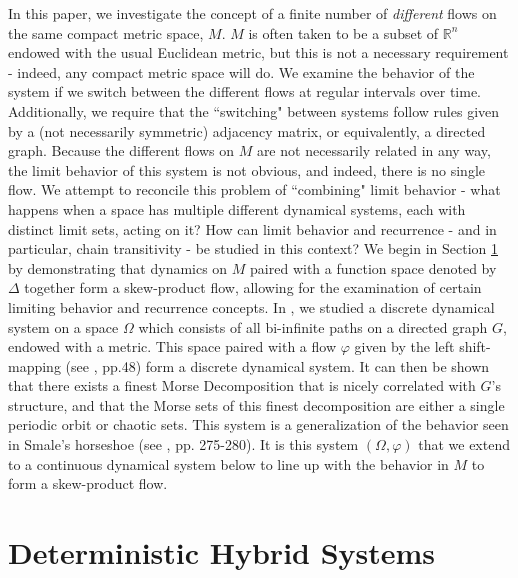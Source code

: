 \documentclass[11pt]{article}
\begin{document}
\indent In this paper, we investigate the concept of a finite number of \emph{different} flows on the same compact metric space, $M$.  $M$ is often taken to be a subset of $\mathbb{R}^n$ endowed with the usual Euclidean metric, but this is not a necessary requirement - indeed, any compact metric space will do.  We examine the behavior of the system if we switch between the different flows at regular intervals over time.  Additionally, we require that the ``switching" between systems follow rules given by a (not necessarily symmetric) adjacency matrix, or equivalently, a directed graph.  Because the different flows on $M$ are not necessarily related in any way, the limit behavior of this system is not obvious, and indeed, there is no single flow.  We attempt to reconcile this problem of ``combining" limit behavior - what happens when a space has multiple different dynamical systems, each with distinct limit sets, acting on it?  How can limit behavior and recurrence - and in particular, chain transitivity - be studied in this context? We begin in Section \ref{DHS} by demonstrating that dynamics on $M$ paired with a function space denoted by $\Delta$ together form a skew-product flow, allowing for the examination of certain limiting behavior and recurrence concepts.  In \cite{discretesystems}, we studied a discrete dynamical system on a space $\Omega$ which consists of all bi-infinite paths on a directed graph $G$, endowed with a metric.   This space paired with a flow $\varphi$ given by the left shift-mapping (see \cite{Katok}, pp.48) form a discrete dynamical system.  It can then be shown that there exists a finest Morse Decomposition that is nicely correlated with $G$'s structure, and that the Morse sets of this finest decomposition are either a single periodic orbit or chaotic sets.  This system is a generalization of the behavior seen in Smale's horseshoe (see 
\cite{Robinson}, pp. 275-280).  It is this system $(\Omega, \varphi)$ that we extend to a continuous dynamical system below to line up with the behavior in $M$ to form a skew-product flow.\\


\section{Deterministic Hybrid Systems}\label{DHS}
\end{document}
